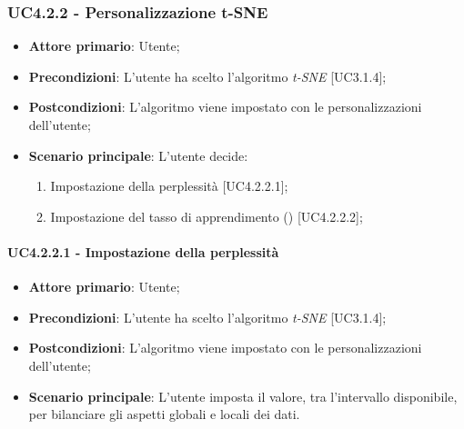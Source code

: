 \subsubsection{UC4.2.2 - Personalizzazione t-SNE}
\begin{itemize}
	\item \textbf{Attore primario}: Utente;
	
	\item \textbf{Precondizioni}: L'utente ha scelto l'algoritmo \textit{t-SNE} [UC3.1.4];
	
	\item \textbf{Postcondizioni}: L'algoritmo viene impostato con le personalizzazioni dell'utente;
	
	\item \textbf{Scenario principale}: L'utente decide:

\begin{enumerate}
\item Impostazione della perplessità [UC4.2.2.1];
\item Impostazione del tasso di apprendimento () [UC4.2.2.2];
\end{enumerate}	

\end{itemize}
	
	
\paragraph{UC4.2.2.1 - Impostazione della perplessità}
\begin{itemize}
	\item \textbf{Attore primario}: Utente;
	
	\item \textbf{Precondizioni}: L'utente ha scelto l'algoritmo \textit{t-SNE} [UC3.1.4];
	
	\item \textbf{Postcondizioni}: L'algoritmo viene impostato con le personalizzazioni dell'utente;
	
	\item \textbf{Scenario principale}: L'utente imposta il valore, tra l'intervallo disponibile, per bilanciare gli aspetti globali e locali dei dati.

\end{itemize}
	
